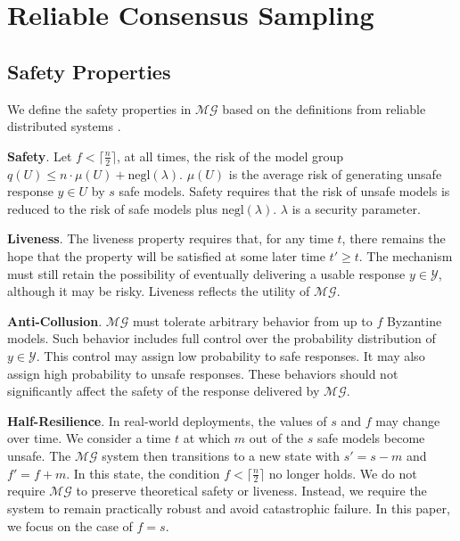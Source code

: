 \section{Reliable Consensus Sampling}
\label{sec:Methodology}


\subsection{Safety Properties}


We define the safety properties in $\mathcal{MG}$ based on the definitions from reliable distributed systems \citep{cachin2011introduction}.

\noindent
\textbf{Safety}. Let $f < \lceil \frac{n}{2} \rceil$, at all times, the risk of the model group $q(U) \leq n \cdot \mu(U) + \mathrm{negl}(\lambda)$. $\mu(U)$ is the average risk of generating unsafe response $y \in U$ by $s$ safe models. Safety requires that the risk of unsafe models is reduced to the risk of safe models plus $\mathrm{negl}(\lambda)$. $\lambda$ is a security parameter.

\noindent
\textbf{Liveness}. The liveness property requires that, for any time $t$, there remains the hope that the property will be satisfied at some later time $t' \ge t$. The mechanism must still retain the possibility of eventually delivering a usable response $y \in \mathcal{Y}$, although it may be risky. Liveness reflects the utility of $\mathcal{MG}$.



\noindent
\textbf{Anti-Collusion}.
$\mathcal{MG}$ must tolerate arbitrary behavior from up to $f$ Byzantine models. Such behavior includes full control over the probability distribution of $y \in \mathcal{Y}$. This control may assign low probability to safe responses. It may also assign high probability to unsafe responses. These behaviors should not significantly affect the safety of the response delivered by $\mathcal{MG}$.


\noindent
\textbf{Half-Resilience}. In real-world deployments, the values of $s$ and $f$ may change over time. We consider a time $t$ at which $m$ out of the $s$ safe models become unsafe. The $\mathcal{MG}$ system then transitions to a new state with $s' = s - m$ and $f' = f + m$. In this state, the condition $f < \lceil \frac{n}{2} \rceil$ no longer holds. We do not require $\mathcal{MG}$ to preserve theoretical safety or liveness. Instead, we require the system to remain practically robust and avoid catastrophic failure. In this paper, we focus on the case of $f=s$.


